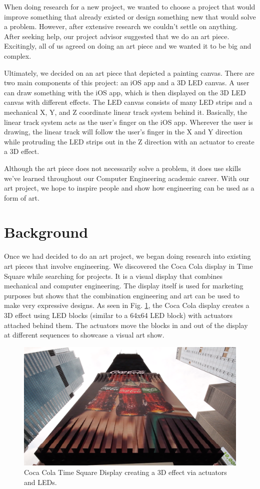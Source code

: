 \documentclass[11pt]{IEEEtran}
\begin{document}
When doing research for a new project, we wanted to choose a project that would improve something that already existed or design something new that would solve a problem. However, after extensive research we couldn’t settle on anything. After seeking help, our project advisor suggested that we do an art piece. Excitingly, all of us agreed on doing an art piece and we wanted it to be big and complex.

Ultimately, we decided on an art piece that depicted a painting canvas. There are two main components of this project: an iOS app and a 3D LED canvas. A user can draw something with the iOS app, which is then displayed on the 3D LED canvas with different effects. The LED canvas consists of many LED strips and a mechanical X, Y, and Z coordinate linear track system behind it. Basically, the linear track system acts as the user’s finger on the iOS app. Wherever the user is drawing, the linear track will follow the user’s finger in the X and Y direction while protruding the LED strips out in the Z direction with an actuator to create a 3D effect.

Although the art piece does not necessarily solve a problem, it does use skills we’ve learned throughout our Computer Engineering academic career. With our art project, we hope to inspire people and show how engineering can be used as a form of art.

\section{Background}
Once we had decided to do an art project, we began doing research into existing art pieces that involve engineering. We discovered the  Coca Cola display in Time Square while searching for projects. It is a visual display that combines mechanical and computer engineering. The display itself is used for marketing purposes but shows that the combination engineering and art can be used to make very expressive designs. As seen in Fig. \ref{fig:cocacola}, the Coca Cola display creates a 3D effect using LED blocks (similar to a 64x64 LED block) with actuators attached behind them. The actuators move the blocks in and out of the display at different sequences to showcase a visual art show.

\begin{figure}[tb]
  \centering
  \includegraphics[width=\textwidth]{image1.png}
  \caption{Coca Cola Time Square Display creating a 3D effect via actuators and LEDs.}
  \label{fig:cocacola}
\end{figure}
\end{document}
